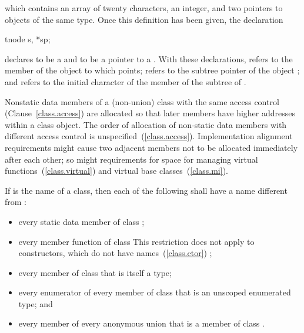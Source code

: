 which contains an array of twenty characters, an integer, and two
pointers to objects of the same type. Once this definition has been
given, the declaration

\begin{codeblock}
tnode s, *sp;
\end{codeblock}

declares  to be a  and  to be a pointer
to a . With these declarations,  refers to
the  member of the object to which  points;
 refers to the  subtree pointer of the object
; and  refers to the initial character
of the  member of the  subtree of .
\exitexample

\pnum
{}%
Nonstatic data members of a (non-union) class
with the same access control (Clause~\ref{class.access})
are allocated so that later
members have higher addresses within a class object.
%
The order of allocation of non-static data members
with different access control
is unspecified~(\ref{class.access}).
Implementation alignment requirements might cause two adjacent members
not to be allocated immediately after each other; so might requirements
for space for managing virtual functions~(\ref{class.virtual}) and
virtual base classes~(\ref{class.mi}).

\pnum
If  is the name of a class, then each of the following shall
have a name different from :

\begin{itemize}
\item every static data member of class ;

\item every member function of class 
\enternote
This restriction does not apply to constructors, which do not have
names~(\ref{class.ctor})
\exitnote;

\item every member of class  that is itself a type;

\item every enumerator of every member of class  that is an
unscoped enumerated type; and

\item every member of every anonymous union that is a member of class
.
\end{itemize}

